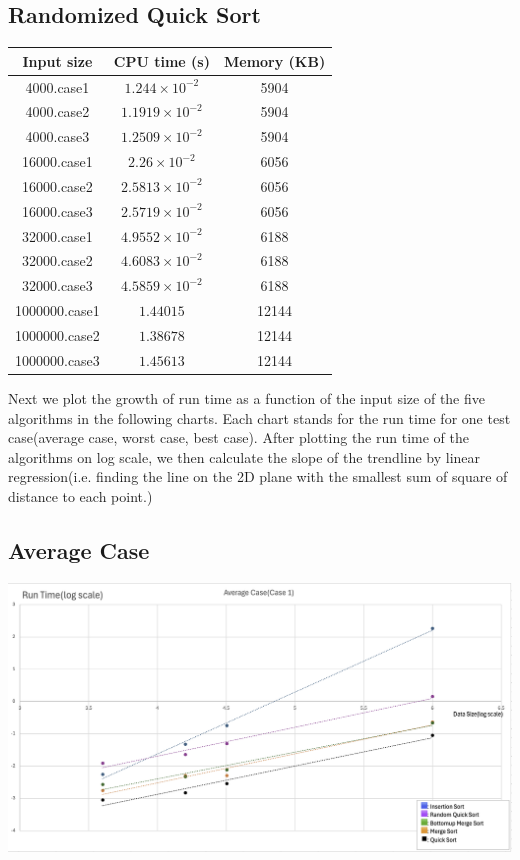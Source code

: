 \documentclass[11pt]{article}
\theoremstyle{definition}
\begin{document}
\subsection*{Randomized Quick Sort}
\begin{center}
  \begin{tabular}{|c|c|c|}
    \hline 
    Input size & CPU time (s) & Memory (KB) \\ 
    \hline 
    4000.case1 & $1.244 \times 10^{-2}$ & 5904 \\ 
    \hline
    4000.case2 & $1.1919 \times 10^{-2}$ & 5904 \\ 
    \hline
    4000.case3 & $1.2509 \times 10^{-2}$ & 5904 \\
    \hline
    16000.case1 & $2.26 \times 10^{-2}$ & 6056 \\ 
    \hline 
    16000.case2 & $2.5813 \times 10^{-2}$ & 6056 \\ 
    \hline
    16000.case3 & $2.5719 \times 10^{-2}$ & 6056 \\ 
    \hline 
    32000.case1 & $4.9552\times10^{-2}$ & 6188 \\ 
    \hline 
    32000.case2 & $4.6083\times 10^{-2}$ & 6188 \\ 
    \hline
    32000.case3 & $4.5859\times 10^{-2}$ & 6188 \\
    \hline 
    1000000.case1 & $1.44015$ & 12144 \\ 
    \hline 
    1000000.case2 & $1.38678$ & 12144 \\ 
    \hline 
    1000000.case3 & $1.45613$ & 12144\\
    \hline
  \end{tabular}
\end{center}
Next we plot the growth of run time as a function of the input size of the five algorithms in the following charts. Each chart stands for the run time for one test case(average case, worst case, best case). After plotting the run time of the algorithms on log scale, we then calculate the slope of the trendline by linear regression(i.e. finding the line on the 2D plane with the smallest sum of square of distance to each point.) \\ 
\subsection*{Average Case}
\includegraphics[width = \textwidth]{Chart 1.png}
\end{document}
